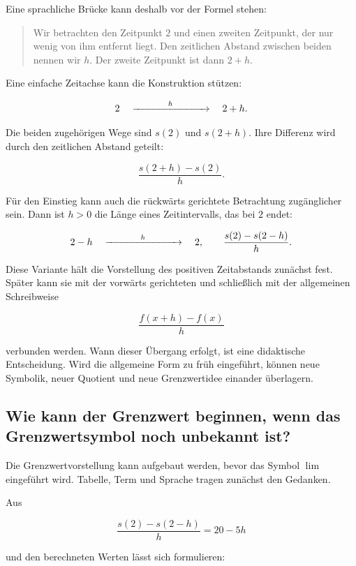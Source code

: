 \documentclass[11pt,a4paper]{article}
\begin{document}
Eine sprachliche Brücke kann deshalb vor der Formel stehen:

\begin{quote}
Wir betrachten den Zeitpunkt $2$ und einen zweiten Zeitpunkt, der nur wenig von
ihm entfernt liegt. Den zeitlichen Abstand zwischen beiden nennen wir $h$. Der
zweite Zeitpunkt ist dann $2+h$.
\end{quote}

Eine einfache Zeitachse kann die Konstruktion stützen:

\[
  2
  \quad\xrightarrow{\hspace*{12mm}h\hspace*{12mm}}\quad
  2+h.
\]

Die beiden zugehörigen Wege sind $s(2)$ und $s(2+h)$. Ihre Differenz wird durch
den zeitlichen Abstand geteilt:

\[
  \frac{s(2+h)-s(2)}{h}.
\]

Für den Einstieg kann auch die rückwärts gerichtete Betrachtung zugänglicher
sein. Dann ist $h>0$ die Länge eines Zeitintervalls, das bei $2$ endet:

\[
  2-h
  \quad\xrightarrow{\hspace*{12mm}h\hspace*{12mm}}\quad
  2,
  \qquad
  \frac{s(2)-s(2-h)}{h}.
\]

Diese Variante hält die Vorstellung des positiven Zeitabstands zunächst fest.
Später kann sie mit der vorwärts gerichteten und schließlich mit der allgemeinen
Schreibweise

\[
  \frac{f(x+h)-f(x)}{h}
\]

verbunden werden. Wann dieser Übergang erfolgt, ist eine didaktische
Entscheidung. Wird die allgemeine Form zu früh eingeführt, können neue Symbolik,
neuer Quotient und neue Grenzwertidee einander überlagern.


\subsection{Wie kann der Grenzwert beginnen, wenn das Grenzwertsymbol noch
unbekannt ist?}

Die Grenzwertvorstellung kann aufgebaut werden, bevor das Symbol $\lim$
eingeführt wird. Tabelle, Term und Sprache tragen zunächst den Gedanken.

Aus

\[
  \frac{s(2)-s(2-h)}{h}=20-5h
\]

und den berechneten Werten lässt sich formulieren:
\end{document}
